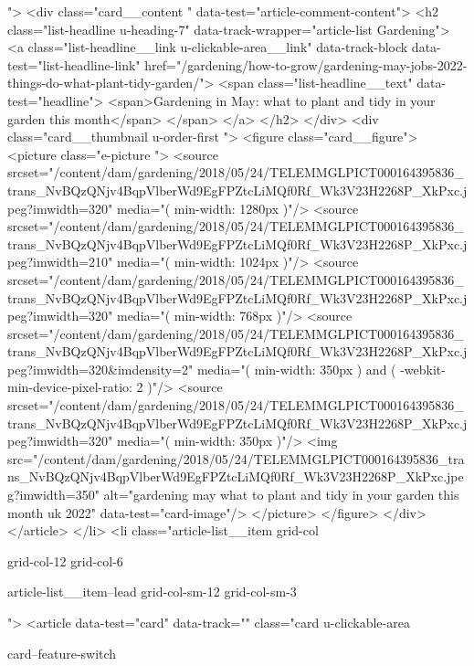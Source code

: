 {{{			
			 ">
<div class="card__content " data-test="article-comment-content">
<h2 class="list-headline  u-heading-7" data-track-wrapper="article-list Gardening">
<a class="list-headline__link u-clickable-area__link" data-track-block data-test="list-headline-link" href="/gardening/how-to-grow/gardening-may-jobs-2022-things-do-what-plant-tidy-garden/">
<span class="list-headline__text" data-test="headline">
<span>Gardening in May: what to plant and tidy in your garden this month</span>
</span>
</a>
</h2>
</div>
<div class="card__thumbnail u-order-first ">
<figure class="card__figure">
<picture class="e-picture   ">
<source srcset="/content/dam/gardening/2018/05/24/TELEMMGLPICT000164395836_trans_NvBQzQNjv4BqpVlberWd9EgFPZtcLiMQf0Rf_Wk3V23H2268P_XkPxc.jpeg?imwidth=320" media="( min-width: 1280px )"/>
<source srcset="/content/dam/gardening/2018/05/24/TELEMMGLPICT000164395836_trans_NvBQzQNjv4BqpVlberWd9EgFPZtcLiMQf0Rf_Wk3V23H2268P_XkPxc.jpeg?imwidth=210" media="( min-width: 1024px )"/>
<source srcset="/content/dam/gardening/2018/05/24/TELEMMGLPICT000164395836_trans_NvBQzQNjv4BqpVlberWd9EgFPZtcLiMQf0Rf_Wk3V23H2268P_XkPxc.jpeg?imwidth=320" media="( min-width: 768px )"/>
<source srcset="/content/dam/gardening/2018/05/24/TELEMMGLPICT000164395836_trans_NvBQzQNjv4BqpVlberWd9EgFPZtcLiMQf0Rf_Wk3V23H2268P_XkPxc.jpeg?imwidth=320&imdensity=2" media="( min-width: 350px ) and ( -webkit-min-device-pixel-ratio: 2 )"/>
<source srcset="/content/dam/gardening/2018/05/24/TELEMMGLPICT000164395836_trans_NvBQzQNjv4BqpVlberWd9EgFPZtcLiMQf0Rf_Wk3V23H2268P_XkPxc.jpeg?imwidth=320" media="( min-width: 350px )"/>
<img src="/content/dam/gardening/2018/05/24/TELEMMGLPICT000164395836_trans_NvBQzQNjv4BqpVlberWd9EgFPZtcLiMQf0Rf_Wk3V23H2268P_XkPxc.jpeg?imwidth=350" alt="gardening may what to plant and tidy in your garden this month uk 2022" data-test="card-image"/>
</picture>
</figure>
</div>
</article>
</li>
<li class="article-list__item
				grid-col
				
				
				
				grid-col-12
				grid-col-6
				
				
				
				
				article-list__item--lead grid-col-sm-12
				grid-col-sm-3
				
				
				">
<article data-test="card" data-track="" class="card
			u-clickable-area
			
			card--feature-switch
			
			
			
			
			
}}}
